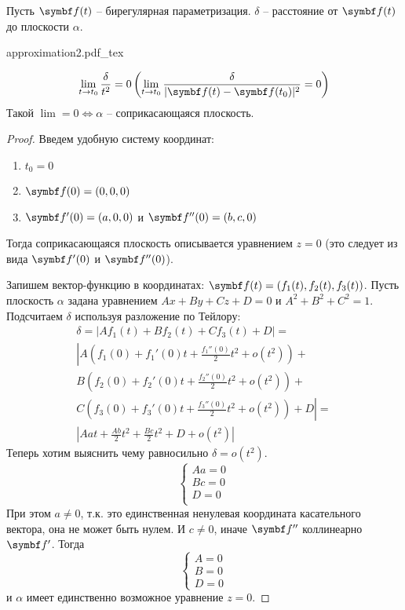 \documentclass[main]{subfiles}
\begin{document}
\begin{theorem}
    Пусть $\vf(t)$ -- бирегулярная параметризация.
    $\delta$ -- расстояние от $\vf(t)$ до плоскости $\alpha$.
    \begin{center}
        {approximation2.pdf_tex}
    \end{center}
    \[\lim_{t \to t_0} \frac{\delta}{t^2} = 0 \left( \lim_{t \to t_0} \frac{\delta}{|\vf(t) - \vf(t_0)|^2} = 0 \right)\]
    Такой $\lim = 0 \Leftrightarrow \alpha$ -- соприкасающаяся плоскость.
\end{theorem}
\begin{proof}
    Введем удобную систему координат:
    \begin{enumerate}
        \item $t_0 = 0$
        \item $\vf(0) = (0,0,0)$
        \item $\vf'(0) = (a,0,0)$ и $\vf''(0) = (b,c,0)$
    \end{enumerate}
    Тогда соприкасающаяся плоскость описывается уравнением $z = 0$ (это следует из вида $\vf'(0)$ и $\vf''(0)$).

    Запишем вектор-функцию в координатах: $\vf(t) = (f_1(t), f_2(t), f_3(t))$.
    Пусть плоскость $\alpha$ задана уравнением $Ax+By+Cz+D = 0$ и $A^2 + B^2 + C^2 = 1$.
    Подсчитаем $\delta$ используя разложение по Тейлору:
    \begin{multline*}
        \delta = |Af_1(t) + Bf_2(t) + Cf_3(t) + D| =\\
        \left| A \left(f_1(0) + f_1'(0)t + \frac{f_1''(0)}{2}t^2 + o(t^2)\right) + \right.\\
        B \left(f_2(0) + f_2'(0)t + \frac{f_2''(0)}{2}t^2 + o(t^2)\right) + \\
        \left. C \left(f_3(0) + f_3'(0)t + \frac{f_3''(0)}{2}t^2 + o(t^2)\right) + D \right| = \\
        \left| Aat + \frac{Ab}{2} t^2 + \frac{Bc}{2}t^2 + D + o(t^2) \right|
    \end{multline*}
    Теперь хотим выяснить чему равносильно $\delta = o(t^2)$.
    \[\begin{cases}
            Aa = 0 \\
            Bc = 0 \\
            D = 0  \\
        \end{cases}\]
    При этом $a \neq 0$, т.к. это единственная ненулевая координата касательного вектора, она не может быть нулем.
    И $c \neq 0$, иначе $\vf''$ коллинеарно $\vf'$. Тогда
    \[\begin{cases}
            A = 0 \\
            B = 0 \\
            D = 0
        \end{cases}\]
    и $\alpha$ имеет единственно возможное уравнение $z = 0$.
\end{proof}
\end{document}
